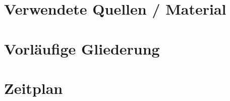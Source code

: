 \documentclass{expose} %
\begin{document}
\section{Verwendete Quellen / Material}
\section{Vorläufige Gliederung}
\section{Zeitplan}


%




\end{document}
